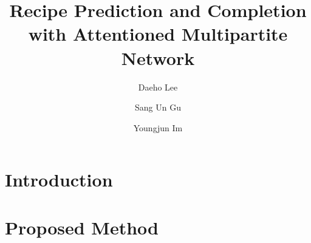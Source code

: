 \documentclass[sigconf, nonacm]{acmart}
\begin{document}
\newcommand{\beq}{\begin{equation}}
	\newcommand{\eeq}{\end{equation}}
\newcommand{\bit}{\begin{itemize*}}
	\newcommand{\eit}{\end{itemize*}}
\newcommand{\goal}[1]{ {\noindent {$\Rightarrow$} \em {#1} } }
\newcommand{\hide}[1]{}


\title{Recipe Prediction and Completion with Attentioned Multipartite Network}


\author{Daeho Lee}

\author{Sang Un Gu}

\author{Youngjun Im}
    
\begin{abstract}
	
\end{abstract}
\maketitle

\section{Introduction}
\label{sec:intro}


%

\section{Proposed Method}
\label{sec:proposed}

\end{document}
